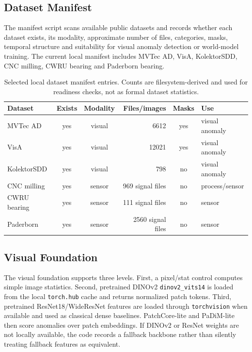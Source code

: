 \documentclass[10pt,conference]{IEEEtran}
\begin{document}
\subsection{Dataset Manifest}
The manifest script scans available public datasets and records whether each dataset exists, its modality, approximate number of files, categories, masks, temporal structure and suitability for visual anomaly detection or world-model training. The current local manifest includes MVTec AD, VisA, KolektorSDD, CNC milling, CWRU bearing and Paderborn bearing.

\begin{table}[t]
\centering
\caption{Selected local dataset manifest entries. Counts are filesystem-derived and used for readiness checks, not as formal dataset statistics.}
\label{tab:manifest}
\small
\setlength{\tabcolsep}{5pt}
\renewcommand{\arraystretch}{1.10}
\begin{tabularx}{\textwidth}{@{}l c c r c Y@{}}
\toprule
Dataset & Exists & Modality & Files/images & Masks & Use \\
\midrule
MVTec AD & yes & visual & 6612 & yes & visual anomaly \\
VisA & yes & visual & 12021 & yes & visual anomaly \\
KolektorSDD & yes & visual & 798 & no & visual anomaly \\
CNC milling & yes & sensor & 969 signal files & no & process/sensor \\
CWRU bearing & yes & sensor & 111 signal files & no & sensor \\
Paderborn & yes & sensor & 2560 signal files & no & sensor \\
\bottomrule
\end{tabularx}
\end{table}

\subsection{Visual Foundation}
The visual foundation supports three levels. First, a pixel/stat control computes simple image statistics. Second, pretrained DINOv2 \texttt{dinov2\_vits14} is loaded from the local \texttt{torch.hub} cache and returns normalized patch tokens. Third, pretrained ResNet18/WideResNet features are loaded through \texttt{torchvision} when available and used as classical dense baselines. PatchCore-lite and PaDiM-lite then score anomalies over patch embeddings. If DINOv2 or ResNet weights are not locally available, the code records a fallback backbone rather than silently treating fallback features as equivalent.
\end{document}
